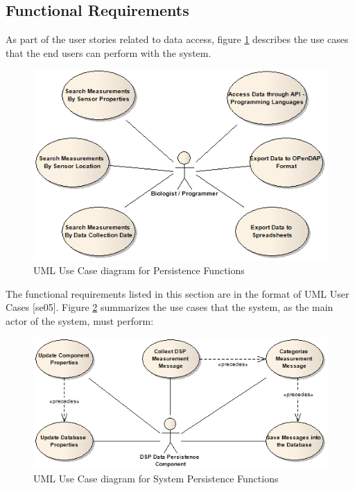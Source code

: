 \subsection{Functional Requirements}
As part of the user stories related to data access, figure
\ref{fig:DSP-Data-Persistence-UseCases-Diagram-Users} describes the use cases
that the end users can perform with the system.

\begin{figure}[!b]
  \centering
  \includegraphics[scale=0.5]{../diagrams/DSP-Data-Persistence-UseCases-Diagram-Users}
  \caption{UML Use Case diagram for Persistence Functions}
  \label{fig:DSP-Data-Persistence-UseCases-Diagram-Users}
\end{figure}

The functional requirements listed in this section are in the format of UML
User Cases [se05]. Figure
\ref{fig:DSP-Data-Persistence-UseCases-Diagram-System} summarizes the use
cases that the system, as the main actor of the system, must perform:

\begin{figure}[!b]
  \centering
  \includegraphics[scale=0.5]{../diagrams/DSP-Data-Persistence-UseCases-Diagram-System}
  \caption{UML Use Case diagram for System Persistence Functions}
  \label{fig:DSP-Data-Persistence-UseCases-Diagram-System}
\end{figure}

